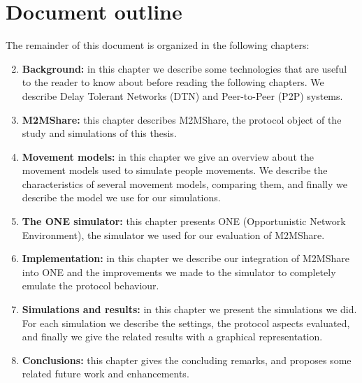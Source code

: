 \section{Document outline}
The remainder of this document is organized in the following chapters:
\begin{enumerate}
\setcounter{enumi}{1}
\item \textbf{Background:} in this chapter we describe some technologies that are useful to the reader to know about before reading the following chapters. We describe Delay Tolerant Networks (DTN) and Peer-to-Peer (P2P) systems.
\item \textbf{M2MShare:} this chapter describes M2MShare, the protocol object of the study and simulations of this thesis.
\item \textbf{Movement models:} in this chapter we give an overview about the movement models used to simulate people movements. We describe the characteristics of several movement models, comparing them, and finally we describe the model we use for our simulations.
\item \textbf{The ONE simulator:} this chapter presents ONE (Opportunistic Network Environment), the simulator we used for our evaluation of M2MShare.
\item \textbf{Implementation:} in this chapter we describe our integration of M2MShare into ONE and the improvements we made to the simulator to completely emulate the protocol behaviour.
\item \textbf{Simulations and results:} in this chapter we present the simulations we did. For each simulation we describe the settings, the protocol aspects evaluated, and finally we give the related results with a graphical representation.
\item \textbf{Conclusions:}  this chapter gives the concluding remarks, and proposes some related future work and enhancements. %

\end{enumerate}
 

